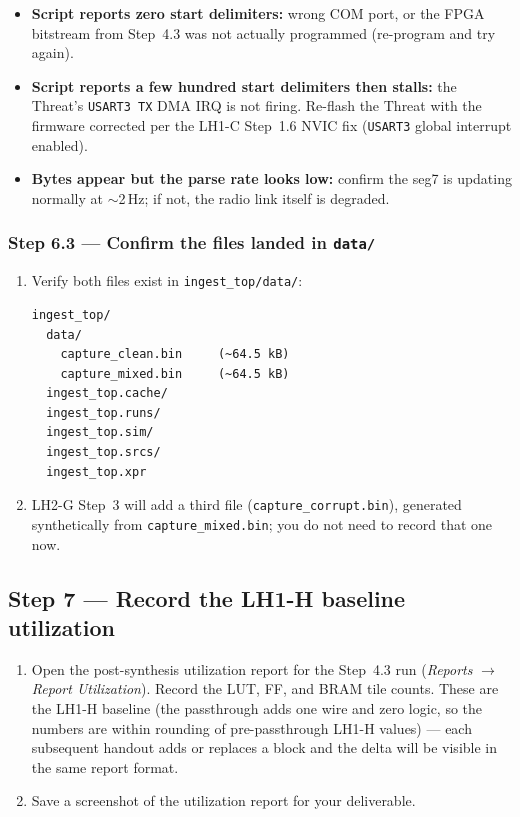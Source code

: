 \documentclass[11pt,letterpaper]{article}
\begin{document}
\begin{tcolorbox}[warning={If a capture comes up short or empty}]
	\begin{itemize}[leftmargin=1.2em]
		\item \textbf{Script reports zero start delimiters:} wrong \mbox{COM} port, or the FPGA bitstream from Step~4.3 was not actually programmed (re-program and try again).
		\item \textbf{Script reports a few hundred start delimiters then stalls:} the Threat's \texttt{USART3 TX} \mbox{DMA} \mbox{IRQ} is not firing. Re-flash the Threat with the firmware corrected per the LH1-C Step~1.6 \mbox{NVIC} fix (\texttt{USART3} global interrupt enabled).
		\item \textbf{Bytes appear but the parse rate looks low:} confirm the seg7 is updating normally at $\sim$2\,Hz; if not, the radio link itself is degraded.
	\end{itemize}
\end{tcolorbox}

\subsubsection*{Step 6.3 --- Confirm the files landed in \texttt{data/}}

\begin{enumerate}[leftmargin=2em]
	\item Verify both files exist in \texttt{ingest\_top/data/}:
\begin{lstlisting}[basicstyle=\scriptsize\ttfamily]
ingest_top/
  data/
    capture_clean.bin     (~64.5 kB)
    capture_mixed.bin     (~64.5 kB)
  ingest_top.cache/
  ingest_top.runs/
  ingest_top.sim/
  ingest_top.srcs/
  ingest_top.xpr
\end{lstlisting}
	\item LH2-G Step~3 will add a third file (\texttt{capture\_corrupt.bin}), generated synthetically from \texttt{capture\_mixed.bin}; you do not need to record that one now.
\end{enumerate}

\newpage
\subsection{Step 7 --- Record the LH1-H baseline utilization}
\begin{enumerate}[leftmargin=2em]
	\item Open the post-synthesis utilization report for the Step~4.3 run (\textit{Reports} $\to$ \textit{Report Utilization}). Record the \mbox{LUT}, \mbox{FF}, and \mbox{BRAM} tile counts. These are the LH1-H baseline (the passthrough adds one wire and zero logic, so the numbers are within rounding of pre-passthrough LH1-H values) --- each subsequent handout adds or replaces a block and the delta will be visible in the same report format.
	\item Save a screenshot of the utilization report for your deliverable.
\end{enumerate}
\end{document}

